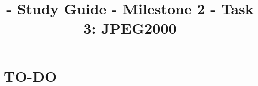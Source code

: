 

\title{\SM{} - Study Guide - Milestone 2 - Task 3: JPEG2000}

\maketitle
\tableofcontents

\section{TO-DO}

